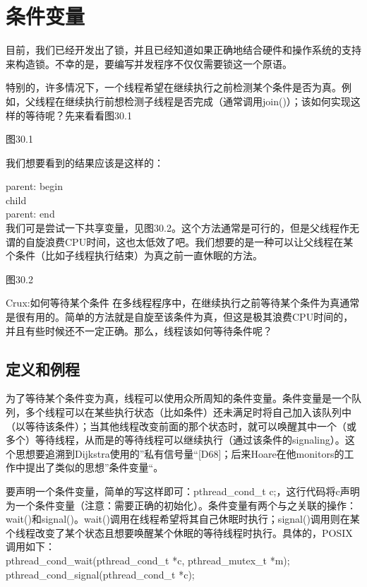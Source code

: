 \chapter{条件变量}
\thispagestyle{empty}

目前，我们已经开发出了锁，并且已经知道如果正确地结合硬件和操作系统的支持来构造锁。不幸的是，要编写并发程序不仅仅需要锁这一个原语。

特别的，许多情况下，一个线程希望在继续执行之前检测某个条件是否为真。例如，父线程在继续执行前想检测子线程是否完成（通常调用join()）；该如何实现这样的等待呢？先来看看图30.1

图30.1

我们想要看到的结果应该是这样的：

parent: begin\\
child\\
parent: end\\

我们可是尝试一下共享变量，见图30.2。这个方法通常是可行的，但是父线程作无谓的自旋浪费CPU时间，这也太低效了吧。我们想要的是一种可以让父线程在某个条件（比如子线程执行结束）为真之前一直休眠的方法。

图30.2

Crux:如何等待某个条件
在多线程程序中，在继续执行之前等待某个条件为真通常是很有用的。简单的方法就是自旋至该条件为真，但这是极其浪费CPU时间的，并且有些时候还不一定正确。那么，线程该如何等待条件呢？


\section{定义和例程}
为了等待某个条件变为真，线程可以使用众所周知的条件变量。条件变量是一个队列，多个线程可以在某些执行状态（比如条件）还未满足时将自己加入该队列中（以等待该条件）；当其他线程改变前面的那个状态时，就可以唤醒其中一个（或多个）等待线程，从而是的等待线程可以继续执行（通过该条件的signaling）。这个思想要追溯到Dijkstra使用的”私有信号量“[D68]；后来Hoare在他monitors的工作中提出了类似的思想”条件变量“。

要声明一个条件变量，简单的写这样即可：pthread\_cond\_t c;，这行代码将c声明为一个条件变量（注意：需要正确的初始化）。条件变量有两个与之关联的操作：wait()和signal()。wait()调用在线程希望将其自己休眠时执行；signal()调用则在某个线程改变了某个状态且想要唤醒某个休眠的等待线程时执行。具体的，POSIX调用如下：\\
pthread\_cond\_wait(pthread\_cond\_t *c, pthread\_mutex\_t *m);\\
pthread\_cond\_signal(pthread\_cond\_t *c);\\

